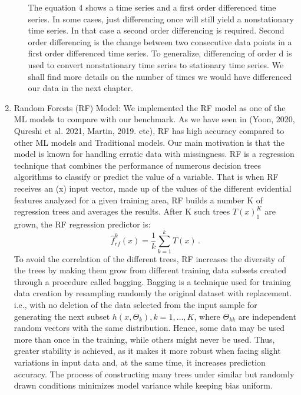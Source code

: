 \documentclass[12pt,italian, twoside]{report}
\begin{document}
\begin{enumerate}
\begin{enumerate}
\begin{equation}
 \end{equation}
The equation 4 shows a time series and a first order differenced time series.  In some cases, just differencing once will still yield a nonstationary time series. In that case a second order differencing is required. Second order differencing is the change between two consecutive data points in a first order differenced time series. To generalize, differencing of order d is used to convert nonstationary time series to stationary time series. We shall find more details on the number of times we would have differenced our data in the next chapter.
         \end{enumerate}
\item Random Forests (RF) Model: We implemented the RF model as one of the ML models to compare with our benchmark. As we have seen in (Yoon, 2020, Qureshi et al. 2021, Martin, 2019.  etc), RF has high accuracy compared to other ML models and Traditional models. Our main motivation is that the model is known for handling erratic data with missingness. RF is a regression technique that combines the performance of numerous decision trees algorithms to classify or predict the value of a variable.  That is when RF receives an (x) input vector, made up of the values of the different evidential features analyzed for a given training area, RF builds a number K of regression trees and averages the results. After K such trees \({T(x)}_1^K\) are grown, the RF regression predictor is:
	\begin{equation}
	\hat{f}_{rf}^k (x) = \frac{1}{k} \sum^k_{k=1} T(x)  \, .
\label{eq:RF}
\end{equation}
To avoid the correlation of the different trees, RF increases the diversity of the trees by making them grow from different training data subsets created through a procedure called bagging. Bagging is a technique used for training data creation by resampling randomly the original dataset with replacement. i.e., with no deletion of the data selected from the input sample for generating the next subset \({h(x,\Theta_k), k = 1,…,K}\), where \({\Theta_{kk}}\) are independent random vectors with the same distribution. Hence, some data may be used more than once in the training, while others might never be used. Thus, greater stability is achieved, as it makes it more robust when facing slight variations in input data and, at the same time, it increases prediction accuracy. The process of constructing many trees under similar but randomly drawn conditions minimizes model variance while keeping bias uniform. 

\end{enumerate}
\end{document}
